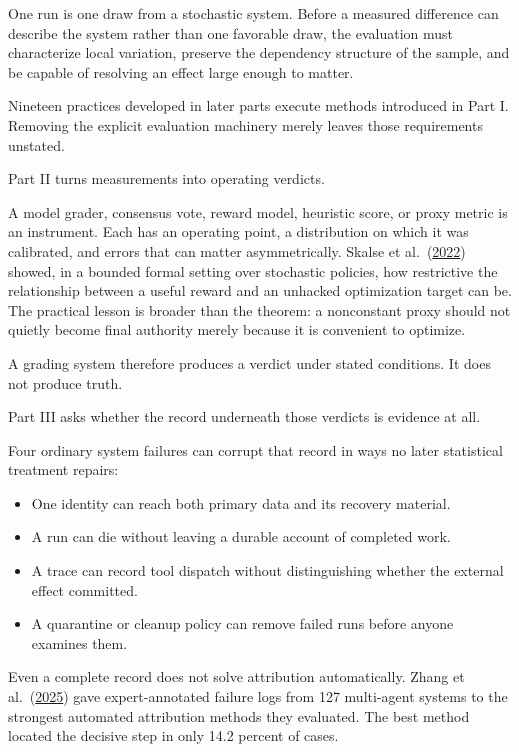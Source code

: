 One run is one draw from a stochastic system. Before a measured difference can describe the system rather than one favorable draw, the evaluation must characterize local variation, preserve the dependency structure of the sample, and be capable of resolving an effect large enough to matter.

Nineteen practices developed in later parts execute methods introduced in Part I. Removing the explicit evaluation machinery merely leaves those requirements unstated.

Part II turns measurements into operating verdicts.

A model grader, consensus vote, reward model, heuristic score, or proxy metric is an instrument. Each has an operating point, a distribution on which it was calibrated, and errors that can matter asymmetrically. Skalse et al.~(\href{https://arxiv.org/abs/2209.13085}{2022}) showed, in a bounded formal setting over stochastic policies, how restrictive the relationship between a useful reward and an unhacked optimization target can be. The practical lesson is broader than the theorem: a nonconstant proxy should not quietly become final authority merely because it is convenient to optimize.

A grading system therefore produces a verdict under stated conditions. It does not produce truth.


Part III asks whether the record underneath those verdicts is evidence at all.

Four ordinary system failures can corrupt that record in ways no later statistical treatment repairs:

\begin{itemize}
\tightlist
\item
  One identity can reach both primary data and its recovery material.
\item
  A run can die without leaving a durable account of completed work.
\item
  A trace can record tool dispatch without distinguishing whether the external effect committed.
\item
  A quarantine or cleanup policy can remove failed runs before anyone examines them.
\end{itemize}

Even a complete record does not solve attribution automatically. Zhang et al.~(\href{https://arxiv.org/abs/2505.00212}{2025}) gave expert-annotated failure logs from 127 multi-agent systems to the strongest automated attribution methods they evaluated. The best method located the decisive step in only 14.2 percent of cases.


